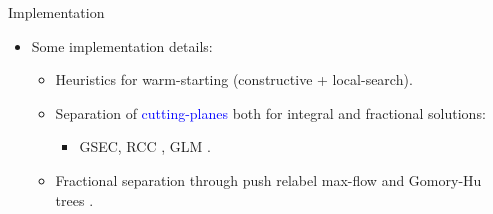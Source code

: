 \begin{frame}{Implementation}
	\begin{itemize}
		\item Some implementation details:
		      \begin{itemize}
			      \item Heuristics for warm-starting (constructive + local-search).
			      \item Separation of \textcolor{blue}{cutting-planes} both for integral and fractional solutions:
			            \begin{itemize}
				            \item GSEC, RCC \parencite{laporte1983}, GLM \parencite{gouveia1995}.
			            \end{itemize}
			      \item Fractional separation through push relabel max-flow \parencite{goldberg1997} and Gomory-Hu trees \parencite{gomory1961}.
		      \end{itemize}
	\end{itemize}
\end{frame}

